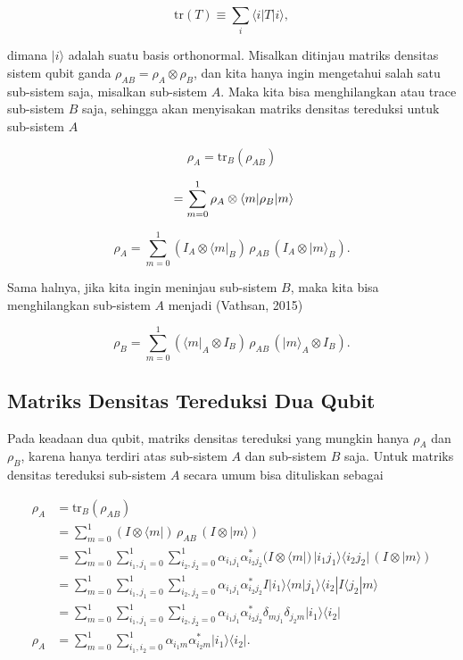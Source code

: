 \begin{equation}
\mathrm{tr}(T) \equiv \sum_i \langle i | T | i \rangle , 
\end{equation}

dimana $|i\rangle$ adalah suatu basis orthonormal. Misalkan ditinjau matriks densitas sistem qubit ganda $\rho_{AB} = \rho_A \otimes \rho_B$, dan kita hanya ingin mengetahui salah satu sub-sistem saja, misalkan sub-sistem $A$. Maka kita bisa menghilangkan atau trace sub-sistem $B$ saja, sehingga akan menyisakan matriks densitas tereduksi untuk sub-sistem $A$

\begin{equation}
\rho_A = \mathrm{tr}_B(\rho_{AB})
\end{equation}

\begin{equation}\\
= \sum_{m=0}^{1} \rho_A \otimes \langle m| \rho_B |m\rangle
\end{equation}

\begin{equation}
\rho_A =
\sum_{m=0}^{1}
(I_A \otimes \langle m|_B)\, \rho_{AB}\, (I_A \otimes |m\rangle_B) .
\end{equation}

Sama halnya, jika kita ingin meninjau sub-sistem $B$, maka kita bisa menghilangkan sub-sistem $A$ menjadi (Vathsan, 2015)

\begin{equation}
\rho_B =
\sum_{m=0}^{1}
(\langle m|_A \otimes I_B)\, \rho_{AB}\, (|m\rangle_A \otimes I_B) .
\end{equation}

\subsection{Matriks Densitas Tereduksi Dua Qubit}

Pada keadaan dua qubit, matriks densitas tereduksi yang mungkin hanya $\rho_A$ dan $\rho_B$, karena hanya terdiri atas sub-sistem $A$ dan sub-sistem $B$ saja. Untuk matriks densitas tereduksi sub-sistem $A$ secara umum bisa dituliskan sebagai

\begin{align}
\rho_A &= \mathrm{tr}_B(\rho_{AB}) \nonumber \\
&= \sum_{m=0}^{1} (I \otimes \langle m|)\, \rho_{AB}\, (I \otimes |m\rangle) \nonumber \\
&= \sum_{m=0}^{1} \sum_{i_1,j_1=0}^{1} \sum_{i_2,j_2=0}^{1}
\alpha_{i_1 j_1}\alpha^{*}_{i_2 j_2}
(I \otimes \langle m|)\, |i_1 j_1\rangle \langle i_2 j_2|\, (I \otimes |m\rangle) \nonumber \\
&= \sum_{m=0}^{1} \sum_{i_1,j_1=0}^{1} \sum_{i_2,j_2=0}^{1}
\alpha_{i_1 j_1}\alpha^{*}_{i_2 j_2}
I |i_1\rangle \langle m|j_1\rangle \langle i_2| I \langle j_2|m\rangle \nonumber \\
&= \sum_{m=0}^{1} \sum_{i_1,j_1=0}^{1} \sum_{i_2,j_2=0}^{1}
\alpha_{i_1 j_1}\alpha^{*}_{i_2 j_2}
\delta_{m j_1}\delta_{j_2 m} |i_1\rangle \langle i_2| \nonumber \\
\rho_A &= \sum_{m=0}^{1} \sum_{i_1,i_2=0}^{1}
\alpha_{i_1 m}\alpha^{*}_{i_2 m}
|i_1\rangle \langle i_2| .
\end{align}


